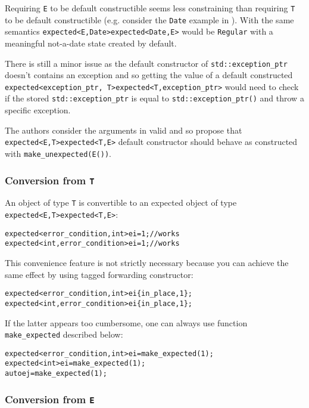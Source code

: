 \documentclass[a4paper,10pt]{article}
\newcommand{\cpp}[1]{\lstinline{#1}}
\newcommand{\suppress}[1]{\colorbox{suppress_color}{#1}}
\newcommand{\update}[1]{\colorbox{update_color}{#1}}
\begin{document}
Requiring \cpp{E} to be default constructible seems less constraining than requiring \cpp{T} to be default constructible (e.g. consider the \cpp{Date} example in \cite{OptionalRev3}). With the same semantics \suppress{\cpp{expected<E,Date>}}\update{\cpp{expected<Date,E>}} would be \cpp{Regular} with a meaningful not-a-date state created by default.

There is still a minor issue as the default constructor of \cpp{std::exception_ptr} doesn't contains an exception and so getting the value of a default constructed \suppress{\cpp{expected<exception_ptr, T>}}\update{\cpp{expected<T,exception_ptr>}} would need to check if the stored \cpp{std::exception_ptr} is equal to \cpp{std::exception_ptr()} and throw a specific exception.

The authors consider the arguments in  \cite{OptionalRev3} valid and so propose that \suppress{\cpp{expected<E,T>}}\update{\cpp{expected<T,E>}} default constructor should behave as constructed with \cpp{make_unexpected(E())}.

\subsubsection{Conversion from \cpp{T}}

An object of type \cpp{T} is convertible to an expected object of type \suppress{\cpp{expected<E,T>}}\update{\cpp{expected<T,E>}}:

\begin{alltt}
\suppress{expected<error_condition, int> ei = 1; // works}
\update{expected<int, error_condition> ei = 1; // works}
\end{alltt}
\noindent
This convenience feature is not strictly necessary because you can achieve the same effect by using tagged forwarding constructor:

\begin{alltt}
\suppress{expected<error_condition, int> ei\{in_place, 1\};}
\update{expected<int, error_condition> ei\{in_place, 1\};}
\end{alltt}
\noindent
If the latter appears too cumbersome, one can always use function \cpp{make_expected} described below:

\begin{alltt}
\suppress{expected<error_condition, int> ei = make_expected(1); }
\update{expected<int> ei = make_expected(1); }
auto ej = make_expected(1); 
\end{alltt}

\subsubsection{Conversion from \cpp{E}}
\end{document}
